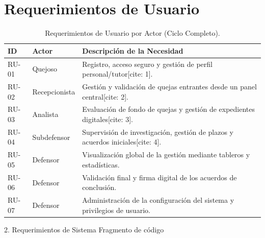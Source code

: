 \section{Requerimientos de Usuario}
\begin{table}[h!]
\centering

\caption{Requerimientos de Usuario por Actor (Ciclo Completo).}
\label{tab:user_req}
\begin{tabular}{@{} l l p{9cm} @{}}
\toprule
\rowcolor[HTML]{2D3E50} 
\textbf{\color[HTML]{FFFFFF} ID} & \textbf{\color[HTML]{FFFFFF} Actor} & \textbf{\color[HTML]{FFFFFF} Descripción de la Necesidad} \\ \midrule
\rowcolor[HTML]{F2F4F7} 

RU-01 & Quejoso & Registro, acceso seguro y gestión de perfil personal/tutor[cite: 1]. \\
RU-02 & Recepcionista & Gestión y validación de quejas entrantes desde un panel central[cite: 2]. \\
\rowcolor[HTML]{F2F4F7} 
RU-03 & Analista & Evaluación de fondo de quejas y gestión de expedientes digitales[cite: 3]. \\
RU-04 & Subdefensor & Supervisión de investigación, gestión de plazos y acuerdos iniciales[cite: 4]. \\
\rowcolor[HTML]{F2F4F7} 
RU-05 & Defensor & Visualización global de la gestión mediante tableros y estadísticas. \\
RU-06 & Defensor & Validación final y firma digital de los acuerdos de conclusión. \\
\rowcolor[HTML]{F2F4F7} 
RU-07 & Defensor & Administración de la configuración del sistema y privilegios de usuario. \\ \bottomrule
\end{tabular}
\end{table}
2. Requerimientos de Sistema
Fragmento de código
